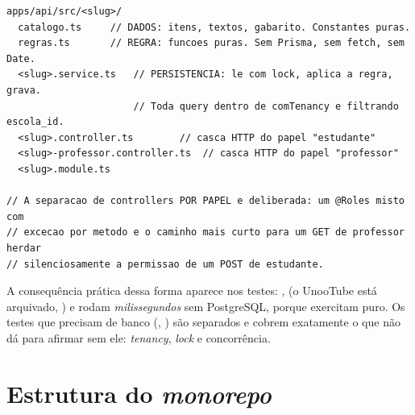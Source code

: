 \begin{lstlisting}[language=tsunoo, caption={Forma canônica de um módulo de domínio de experiência}, label={lst:modulo}]
apps/api/src/<slug>/
  catalogo.ts     // DADOS: itens, textos, gabarito. Constantes puras.
  regras.ts       // REGRA: funcoes puras. Sem Prisma, sem fetch, sem Date.
  <slug>.service.ts   // PERSISTENCIA: le com lock, aplica a regra, grava.
                      // Toda query dentro de comTenancy e filtrando escola_id.
  <slug>.controller.ts        // casca HTTP do papel "estudante"
  <slug>-professor.controller.ts  // casca HTTP do papel "professor"
  <slug>.module.ts

// A separacao de controllers POR PAPEL e deliberada: um @Roles misto com
// excecao por metodo e o caminho mais curto para um GET de professor herdar
// silenciosamente a permissao de um POST de estudante.
\end{lstlisting}

\begin{nota}
A consequência prática dessa forma aparece nos testes: ,
 (o UnooTube está arquivado, ) e  rodam
\emph{milissegundos} sem PostgreSQL, porque exercitam  puro. Os
testes que precisam de banco (, )
são separados e cobrem exatamente o que não dá para afirmar sem ele:
\emph{tenancy}, \emph{lock} e concorrência.
\end{nota}

\section{Estrutura do \emph{monorepo}}
\label{sec:monorepo}

